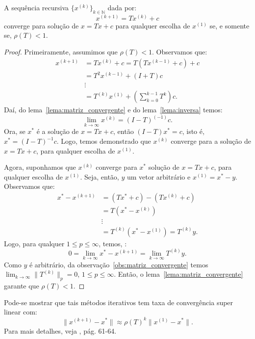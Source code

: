 \begin{teo}\label{teo:convergencia}
  A sequência recursiva $\{x^{(k)}\}_{k\in\mathbb{N}}$ dada por:
  \begin{equation*}
    x^{(k+1)} = Tx^{(k)} + c
  \end{equation*}
converge para solução de $x = Tx + c$ para qualquer escolha de $x^{(1)}$ se, e somente se, $\rho(T) < 1$.
\end{teo}
\begin{proof}
  Primeiramente, assumimos que $\rho(T) < 1$. Observamos que:
  \begin{eqnarray*}
    x^{(k+1)} &= Tx^{(k)} + c = T(Tx^{(k-1)} + c) + c \\
    &= T^2x^{(k-1)} + (I + T)c \\
    &\vdots\\
    &= T^{(k)}x^{(1)} + \left(\sum_{k=0}^{k-1}T^k\right)c.
  \end{eqnarray*}
Daí, do lema~\ref{lema:matriz_convergente} e do lema~\ref{lema:inversa} temos:
\begin{equation*}
  \lim_{k\to\infty} x^{(k)} = (I - T)^{(-1)}c.
\end{equation*}
Ora, se $x^*$ é a solução de $x = Tx + c$, então $(I - T)x^* = c$, isto é, $x^* = (I - T)^{-1}c$. Logo, temos demonstrado que $x^{(k)}$ converge para a solução de  $x = Tx + c$, para qualquer escolha de $x^{(1)}$.

Agora, suponhamos que $x^{(k)}$ converge para $x^*$ solução de $x = Tx + c$, para qualquer escolha de $x^{(1)}$. Seja, então, $y$ um vetor arbitrário e $x^{(1)} = x^* - y$. Observamos que:
\begin{eqnarray*}
  x^* - x^{(k+1)} &= (Tx^* + c) - (Tx^{(k)} + c) \\
  &= T(x^* - x^{(k)})\\
  &\vdots\\
  &= T^{(k)}(x^* - x^{(1)}) = T^{(k)}y.
\end{eqnarray*}
Logo, para qualquer $1 \leq p \leq\infty$, temos, :
\begin{equation*}
  0 = \lim_{k\to\infty} x^* - x^{(k+1)} = \lim_{k\to\infty} T^{(k)}y.
\end{equation*}
Como $y$ é arbitrário, da observação~\ref{obs:matriz_convergente} temos $\displaystyle\lim_{k\to\infty} \|T^{(k)}\|_p = 0$, $1 \leq p \leq \infty$. Então, o lema~\ref{lema:matriz_convergente} garante que $\rho(T) < 1$.
\end{proof}

\begin{obs}
  Pode-se mostrar que tais métodos iterativos tem taxa de convergência super linear com:
  \begin{equation*}
    \|x^{(k+1)} - x^*\| \approx \rho(T)^{k}\|x^{(1)} - x^*\|.
  \end{equation*}
Para mais detalhes, veja \cite{Isaacson1994a}, pág. 61-64.
\end{obs}

